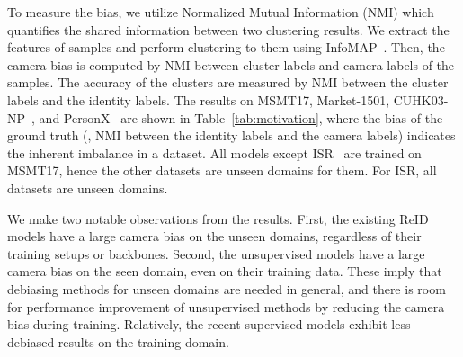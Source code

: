 To measure the bias, we utilize Normalized Mutual Information (NMI) which quantifies the shared information between two clustering results.
We extract the features of samples and perform clustering to them using InfoMAP~\citep{infomap}.
Then, the camera bias is computed by NMI between cluster labels and camera labels of the samples.
The accuracy of the clusters are measured by NMI between the cluster labels and the identity labels.
The results on MSMT17, Market-1501, CUHK03-NP~\citep{cuhk_np}, and PersonX~\citep{personx} are shown in Table~\ref{tab:motivation}, where the bias of the ground truth (\ie, NMI between the identity labels and the camera labels) indicates the inherent imbalance in a dataset.
All models except ISR~\citep{dou2023identity} are trained on MSMT17, hence the other datasets are unseen domains for them.
For ISR, all datasets are unseen domains.

We make two notable observations from the results.
First, the existing ReID models have a large camera bias on the unseen domains, regardless of their training setups or backbones.
Second, the unsupervised models have a large camera bias on the seen domain, 
even on their training data.
These imply that debiasing methods for unseen domains are needed in general, and there is room for performance improvement of unsupervised methods by reducing the camera bias during training.
Relatively, the recent supervised models exhibit less debiased results on the training domain.